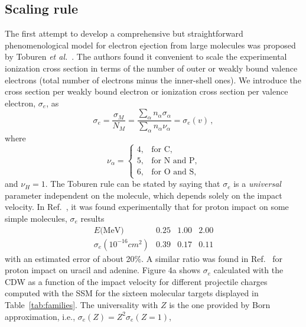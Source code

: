 \documentclass[preprint,12pt]{article}
\begin{document}
\subsection{Scaling rule}

The first attempt to develop a comprehensive but straightforward 
phenomenological model for electron ejection from large molecules was 
proposed by Toburen {\it et al.}~\cite{toburen1975,toburen1976}. 
The authors found it convenient to scale the experimental ionization 
cross section in terms of the number of outer or weakly bound valence 
electrons (total number of electrons minus the inner-shell ones). 
We introduce the cross section per weakly bound electron or ionization 
cross section per valence electron, $\sigma_{e}$, as
\begin{equation}
\sigma_{e}=\frac{\sigma_{M}}{N_{M}}=\frac{\sum\limits_{\alpha}
n_{\alpha}\sigma_{\alpha}}{\sum\limits_{\alpha}n_{\alpha}\nu_{\alpha}}
=\sigma_{e}(v)\,, 
\label{27} 
\end{equation}
where
\begin{equation}
\nu_{\alpha}=\left\{ 
\begin{array}{ll}
4, & \text{for C,} \\ 
5, & \text{for N and P,} \\ 
6, & \text{for O and S,}
\end{array}\right.
\label{eq:nelec} 
\end{equation}
and $\nu_{H}=1$. The Toburen rule can be stated by saying that 
$\sigma_{e}$ is a \textit{universal} parameter independent on the 
molecule, which depends solely on the impact velocity. 
In Ref.~\cite{toburen1976}, it was found experimentally that for proton 
impact on some simple molecules, $\sigma_{e}$ results
\begin{equation}
\begin{array}{cccc}
E\text{(MeV)}               & 0.25 & 1.00 & 2.00 \\ 
\sigma_{e} (10^{-16}cm^{2}) & 0.39 & 0.17 & 0.11
\end{array}
\label{30}
\end{equation}
with an estimated error of about 20\%. A similar ratio was found in 
Ref.~\cite{itoh2013} for proton impact on uracil and adenine. 
Figure 4a shows $\sigma_{e}$ calculated with the CDW as a function of 
the impact velocity for different projectile charges computed with the 
SSM for the sixteen molecular targets displayed in 
Table~\ref{tab:families}. The universality with $Z$ is the one provided 
by Born approximation, i.e., $\sigma _{e}(Z)=Z^{2}\sigma_{e}(Z=1)$, 
\end{document}
